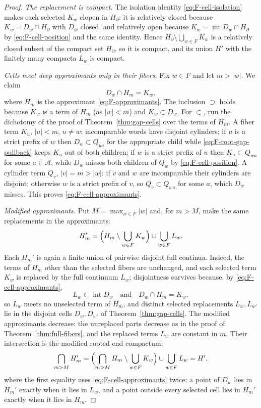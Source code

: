 \documentclass[11pt,reqno]{amsart}
\theoremstyle{definition}
\theoremstyle{remark}
\newcommand{\Int}{\operatorname{int}}
\begin{document}
\begin{proof}
\emph{The replacement is compact.}
The isolation identity \eqref{eq:F-cell-isolation} makes each selected
$K_w$ clopen in $H_\partial$: it is relatively closed because
$K_w=D_w\cap H_\partial$ with $D_w$ closed, and relatively open because
$K_w=\Int D_w\cap H_\partial$ by \eqref{eq:F-cell-position} and the same
identity.  Hence $H_\partial\setminus\bigcup_{w\in F}K_w$ is a relatively
closed subset of the compact set $H_\partial$, so it is compact, and its
union $H'$ with the finitely many compacta $L_w$ is compact.

\emph{Cells meet deep approximants only in their fibers.}
Fix $w\in F$ and let $m>|w|$.  We claim
\begin{equation}\label{eq:F-cell-approximants}
D_w\cap H_m=K_w ,
\end{equation}
where $H_m$ is the approximant \eqref{eq:F-approximants}.  The inclusion
$\supset$ holds because $K_w$ is a term of $H_m$ (as $|w|<m$) and
$K_w\subset D_w$.  For $\subset$, run the dichotomy of the proof of
Theorem~\ref{thm:gap-cells} over the terms of $H_m$.  A fiber term $K_u$,
$|u|<m$, $u\ne w$: incomparable words have disjoint cylinders; if $u$ is
a strict prefix of $w$ then $D_w\subset Q_{ua}$ for the appropriate child
while \eqref{eq:F-root-gap-pullback} keeps $K_u$ out of both children; if
$w$ is a strict prefix of $u$ then $K_u\subset Q_{wa}$ for some
$a\in\mathcal A$, while $D_w$ misses both children of $Q_w$ by
\eqref{eq:F-cell-position}.  A cylinder term $Q_v$, $|v|=m>|w|$: if $v$
and $w$ are incomparable their cylinders are disjoint; otherwise $w$ is a
strict prefix of $v$, so $Q_v\subset Q_{wa}$ for some $a$, which $D_w$
misses.  This proves \eqref{eq:F-cell-approximants}.

\emph{Modified approximants.}
Put $M=\max_{w\in F}|w|$ and, for $m>M$, make the same replacements in
the approximants:
\[
H_m'
=\Bigl(H_m\setminus\bigcup_{w\in F}K_w\Bigr)
\cup\bigcup_{w\in F}L_w .
\]
Each $H_m'$ is again a finite union of pairwise disjoint full continua.
Indeed, the terms of $H_m$ other than the selected fibers are unchanged,
and each selected term $K_w$ is replaced by the full continuum $L_w$;
disjointness survives because, by \eqref{eq:F-cell-approximants},
\[
L_w\subset\Int D_w
\quad\text{and}\quad
D_w\cap H_m=K_w ,
\]
so $L_w$ meets no unselected term of $H_m$, and distinct selected
replacements $L_w,L_{w'}$ lie in the disjoint cells $D_w,D_{w'}$ of
Theorem~\ref{thm:gap-cells}.  The modified approximants decrease: the
unreplaced parts decrease as in the proof of
Theorem~\ref{thm:full-fibers}, and the replaced terms $L_w$ are constant
in $m$.  Their intersection is the modified rooted-end compactum:
\[
\bigcap_{m>M}H_m'
=\Bigl(\bigcap_{m>M}H_m\setminus\bigcup_{w\in F}K_w\Bigr)
\cup\bigcup_{w\in F}L_w
=H' ,
\]
where the first equality uses \eqref{eq:F-cell-approximants} twice: a
point of $D_w$ lies in $H_m'$ exactly when it lies in $L_w$, and a point
outside every selected cell lies in $H_m'$ exactly when it lies in
$H_m$.


\end{proof}
\end{document}
